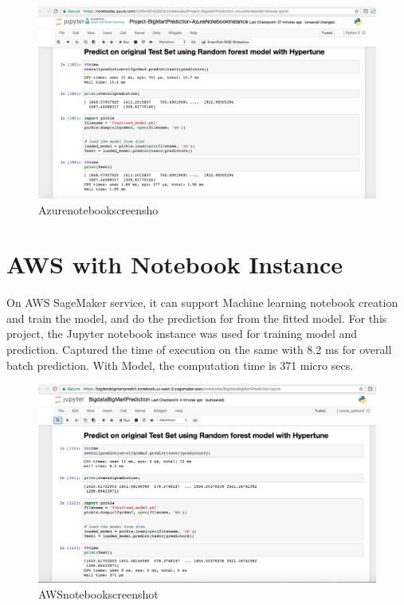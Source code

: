 \begin{figure}[pic9]
\centering
\includegraphics[width=\columnwidth]{Images/Azurenotebookscreenshot.png}
\caption{Azurenotebookscreensho}
\label{fig:Azurenotebookscreensho}
\end{figure}

\section{AWS with Notebook Instance}

On AWS SageMaker service, it can support Machine learning notebook creation 
and train the model, and do the prediction for from the fitted model. For this 
project, the Jupyter notebook instance was used for training model and 
prediction. Captured the time of execution on the same with 8.2 ms for overall 
batch prediction. With Model, the computation time is 371 micro secs.

\begin{figure}[pic10]
\centering
\includegraphics[width=\columnwidth]{Images/AWSnotebookscreenshot.png}
\caption{AWSnotebookscreenshot}
\label{fig:AWSnotebookscreenshot}
\end{figure}


